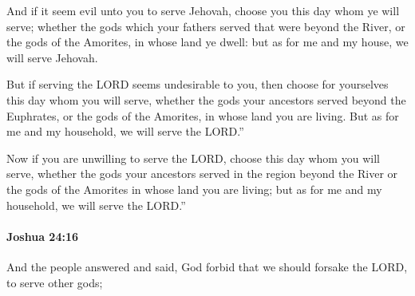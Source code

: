 			\begin{versebox}
					\item[BHS] 
					\item[ASV] And if it seem evil unto you to serve Jehovah, choose you this day whom ye will serve; whether the gods which your fathers served that were beyond the River, or the gods of the Amorites, in whose land ye dwell: but as for me and my house, we will serve Jehovah.
					\item[NIV] But if serving the LORD seems undesirable to you, then choose for yourselves this day whom you will serve, whether the gods your ancestors served beyond the Euphrates, or the gods of the Amorites, in whose land you are living. But as for me and my household, we will serve the LORD.”
					\item[NRSV] Now if you are unwilling to serve the LORD, choose this day whom you will serve, whether the gods your ancestors served in the region beyond the River or the gods of the Amorites in whose land you are living; but as for me and my household, we will serve the LORD.”
			\end{versebox}

		\paragraph{Joshua 24:16} %
			\label{JOSHUA-24-16}

			And the people answered and said, God forbid that we should forsake the LORD, to serve other gods;

